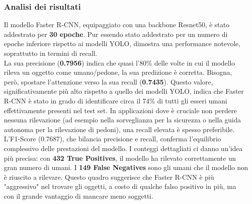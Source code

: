 \documentclass[12pt]{article}
\begin{document}
\subsubsection{Analisi dei risultati}
Il modello Faster R-CNN, equipaggiato con una backbone Resnet50, è stato addestrato per \textbf{30 epoche}. Pur essendo stato addestrato per un numero di epoche inferiore rispetto ai modelli YOLO, dimostra una performance notevole, soprattutto in termini di recall. \\
La sua precisione (\textbf{0.7956}) indica che quasi l'80\% delle volte in cui il modello rileva un oggetto come umano/pedone, la sua predizione è corretta. Bisogna, però, spostare l'attenzione verso la sua recall (\textbf{0.7435}). Questo valore, significativamente più alto rispetto a quello dei modelli YOLO, indica che Faster R-CNN è stato in grado di identificare circa il 74\% di tutti gli esseri umani effettivamente presenti nel test set. In applicazioni dove è cruciale non perdere nessuna rilevazione (ad esempio nella sorveglianza per la sicurezza o nella guida autonoma per la rilevazione di pedoni), una recall elevata è spesso preferibile.
L'F1-Score (0.7687), che bilancia precisione e recall, conferma l'equilibrio complessivo delle prestazioni del modello. I conteggi dettagliati ci danno un'idea più precisa: con \textbf{432 True Positives}, il modello ha rilevato correttamente un gran numero di umani. I \textbf{149 False Negatives} sono gli umani che il modello non è riuscito a rilevare. Questo quadro suggerisce che Faster R-CNN è più "aggressivo" nel trovare gli oggetti, a costo di qualche falso positivo in più, ma con il grande vantaggio di mancare meno soggetti.
\end{document}
